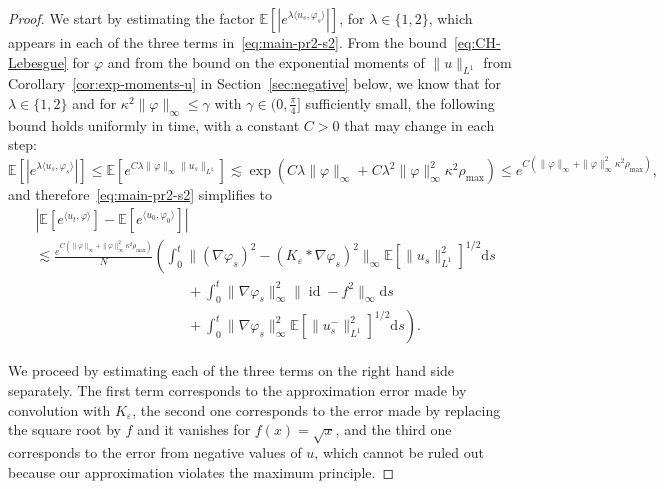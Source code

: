 \documentclass[a4paper,12pt]{article}
\newcommand{\mathd}{\mathrm{d}}
\newcommand{\E}{\mathbb{E}}
\begin{document}
\begin{proof}
  We start by estimating the factor $\E[|e^{\lambda \langle u_s,\varphi_s\rangle}|]$, for $\lambda \in \{1,2\}$, which appears in each of the three terms in~\eqref{eq:main-pr2-s2}. From the bound~\eqref{eq:CH-Lebesgue} for $\varphi$ and from the bound on the exponential moments of $\|u\|_{L^1}$ from Corollary~\ref{cor:exp-moments-u} in Section~\ref{sec:negative} below, we know that for $\lambda \in \{ 1, 2 \}$ and for $\kappa^2\|\varphi\|_\infty \leq \gamma$ with $\gamma \in (0,\tfrac\pi4]$ sufficiently small, the following bound holds uniformly in time, with a constant $C>0$ that may change in each step:
  \begin{equation*}
    \mathbb{E} [|e^{\lambda \langle u_s, \varphi_s \rangle}|] \leq
     \mathbb{E} \left[ e^{C\lambda  \| \varphi \|_{\infty} \| u_s \|_{L^1}}
     \right] \lesssim \exp (C\lambda \| \varphi \|_{\infty}
     +C\lambda^2 \| \varphi \|_{\infty}^2 \kappa^2 \rho_{\max})  \leq e^{C (\| \varphi \|_{\infty} + \| \varphi \|_{\infty}^2 \kappa^2\rho_{\max})},
  \end{equation*}
  and therefore~\eqref{eq:main-pr2-s2} simplifies to
  \begin{align} \nonumber
      & | \mathbb{E} [e^{\langle u_t, \varphi \rangle}] -\mathbb{E} [e^{\langle
    u_0, \varphi_0 \rangle}] |\\ \label{eq:main-pr3-s2}
      & \lesssim \frac{e^{C (\| \varphi \|_{\infty} + \| \varphi \|_{\infty}^2 \kappa^2 \rho_{\max})}}{N} \left(\int_0^t \| (\nabla \varphi_s)^2 - ( K_{\varepsilon} \ast
    \nabla \varphi_s )^2 \|_{\infty} \mathbb{E} [\| u_s \|_{L^1}^2]^{1 / 2}
    \mathd s\right. \\ \label{eq:main-pr4-s2}
      & \hspace{130pt} +  \int_0^t \| \nabla \varphi_s \|_{\infty}^2 \| \operatorname{id} - f^2 \|_{\infty} \mathd s \\ \label{eq:main-pr5-s2}
      & \hspace{130pt} + \left.\int_0^t \| \nabla \varphi_s \|_{\infty}^2 \mathbb{E} [\| u_s^- \|_{L^1}^2]^{1 / 2} \mathd s\right).
  \end{align}
  
  We proceed by estimating each of the three terms on the right hand side separately. The first term corresponds to the approximation error made by convolution with $K_\varepsilon$, the second one corresponds to the error made by replacing the square root by $f$ and it vanishes for $f(x) = \sqrt{x}$, and the third one corresponds to the error from negative values of $u$, which cannot be ruled out because our approximation violates the maximum principle.
  

\end{proof}
\end{document}
